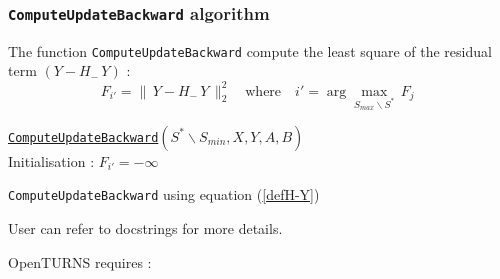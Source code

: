 \newpage
\subsubsection{\texttt{ComputeUpdateBackward} algorithm}

The function \texttt{ComputeUpdateBackward} compute the least square of the residual term  $(Y-H_{-}\,Y)$ : 
 \begin{equation}
\boxed{  F_{i'}=\|\,Y-H_{-}\,Y\,\|^2_2 \quad\text{where}\quad {i'} = \displaystyle\arg \max_{S_{max} \backslash S^*}\, F_{j}\,\, }
 \end{equation}

\IncMargin{2em}
\begin{algorithm}
\underline{\texttt{ComputeUpdateBackward}}$(S^*\backslash S_{min},X,Y,A,B)$\\
\BlankLine
Initialisation : $F_{i'} = -\infty$
\BlankLine
{}
\caption{\texttt{ComputeUpdateBackward} using equation (\ref{defH-Y}) }
\end{algorithm}




User can refer to docstrings for more details.

OpenTURNS requires :



